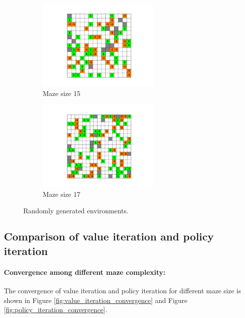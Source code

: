 \documentclass{article}
\begin{document}
\begin{figure}[H]
    \begin{subfigure}{.5\textwidth}
        \centering
        \includegraphics[width=60mm]{../results/maze_size_15/env.png}
        \caption{Maze size 15}
        \label{fig:random_env_5}
    \end{subfigure}
    \begin{subfigure}{.5\textwidth}
        \centering
        \includegraphics[width=60mm]{../results/maze_size_17/env.png}
        \caption{Maze size 17}
        \label{fig:random_env_6}
    \end{subfigure}
    \caption{Randomly generated environments.}
\end{figure}

\subsection{Comparison of value iteration and policy iteration}

\paragraph{Convergence among different maze complexity:} The convergence of value iteration and policy iteration for different maze size is shown in Figure \ref{fig:value_iteration_convergence} and Figure \ref{fig:policy_iteration_convergence}.
\end{document}
